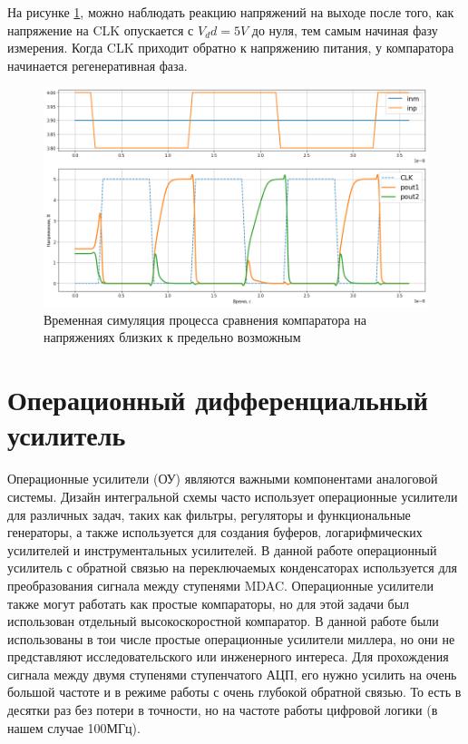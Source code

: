 \documentclass[a4paper,12pt]{article} %
\begin{document}
На рисунке \ref{pic:tran_comparator}, можно наблюдать реакцию напряжений на выходе после того, как напряжение на CLK опускается с $V_dd = 5V $ до нуля, тем самым начиная фазу измерения. Когда CLK приходит обратно к напряжению питания, у компаратора начинается регенеративная фаза.


\begin{figure}[H]
    \includegraphics[width=\textwidth]{comparator/comp_res.png}
    \caption{Временная симуляция процесса сравнения компаратора на напряжениях близких к предельно возможным}
    \label{pic:tran_comparator}
\end{figure}





\section{Операционный дифференциальный усилитель}

Операционные усилители (ОУ) являются важными компонентами аналоговой системы. Дизайн интегральной схемы часто использует операционные усилители для различных задач, таких как фильтры, регуляторы и функциональные генераторы, а также используется для создания буферов, логарифмических усилителей и инструментальных усилителей. В данной работе операционный усилитель с обратной связью на переключаемых конденсаторах используется для преобразования сигнала между ступенями MDAC. Операционные усилители также могут работать как простые компараторы, но для этой задачи был использован отдельный высокоскоростной компаратор. В данной работе были использованы в тои числе простые операционные усилители миллера, но они не представляют исследовательского или инженерного интереса.  Для прохождения сигнала между двумя ступенями ступенчатого АЦП, его нужно усилить на очень большой частоте и в режиме работы с очень глубокой обратной связью. То есть в десятки раз без потери в точности, но на частоте работы цифровой логики (в нашем случае 100МГц).
\end{document}
